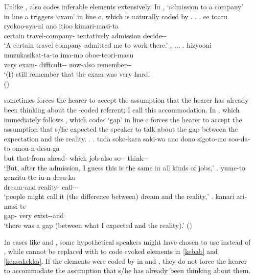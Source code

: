 Unlike ,
 also codes inferable elements extensively.
In \Next,
 `admission to a company' in line a triggers
 `exam' in line c,
which is naturally coded by .
%
\ex.\label{siken} \ag. ee toaru ryokoo-sya-ni ano itioo  kimari-masi-ta \\
		 certain travel-company-  tentatively admission decide-- \\
		`A certain travel company admitted me to work there.'
	\b. ...
	\bg. hizyooni  muzukasikat-ta-to ima-mo oboe-teori-masu \\
	very exam- difficult-- now-also remember-- \\
	`(I) still remember that the exam was very hard.' \\
\hfill{()}

 sometimes forces the hearer to accept the assumption that the hearer has already been thinking about the -coded referent;
I call this {accommodation}.
In \Next, which immediately follows \Last,
 which codes  `gap' in line c
forces the hearer to accept the assumption that s/he expected the speaker to talk about the gap between the expectation and the reality.
%
\ex. \ag. tada soko-kara saki-wa ano dono sigoto-mo soo-da-to omou-n-desu-ga \\
	but that-from ahead-  which job-also so-- think-- \\
	`But, after the admission, I guess this is the same in all kinds of jobs,'
	\bg. yume-to genzitu-tte iu-n-desu-ka \\
		dream-and reality- call--- \\
		`people might call it (the difference between) dream and the reality,'
	\bg.  kanari ari-masi-te \\
			gap- very exist--and \\
			`there was a gap (between what I expected and the reality).'
\hfill{()}

In cases like \LLast and \Last,
some hypothetical speakers might have chosen to use 
instead of ,
while  cannot be replaced with 
to code evoked elements in \ref{kebab} and \ref{kensakekka}.
If the elements were coded by  in \LLast and \Last,
they do not force the hearer to accommodate the assumption that s/he has already been thinking about them.


